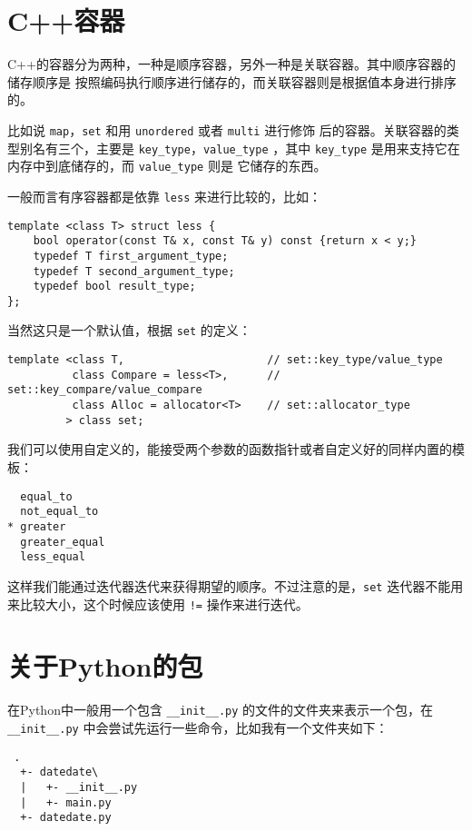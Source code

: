
\section{C++容器}

C++的容器分为两种，一种是顺序容器，另外一种是关联容器。其中顺序容器的储存顺序是
按照编码执行顺序进行储存的，而关联容器则是根据值本身进行排序的。

比如说 \verb|map|，\verb|set| 和用 \verb|unordered| 或者 \verb|multi| 进行修饰
后的容器。关联容器的类型别名有三个，主要是 \verb|key_type|，\verb|value_type|%
，其中 \verb|key_type| 是用来支持它在内存中到底储存的，而 \verb|value_type| 则是
它储存的东西。

一般而言有序容器都是依靠 \verb|less| 来进行比较的，比如：
\begin{lstlisting}
template <class T> struct less {
    bool operator(const T& x, const T& y) const {return x < y;}
    typedef T first_argument_type;
    typedef T second_argument_type;
    typedef bool result_type;
};
\end{lstlisting}

当然这只是一个默认值，根据 \verb|set| 的定义：
\begin{lstlisting}
template <class T,                      // set::key_type/value_type
          class Compare = less<T>,      // set::key_compare/value_compare
          class Alloc = allocator<T>    // set::allocator_type
         > class set;
\end{lstlisting}

我们可以使用自定义的，能接受两个参数的函数指针或者自定义好的同样内置的模板：
\begin{lstlisting}
  equal_to
  not_equal_to
* greater
  greater_equal
  less_equal
\end{lstlisting}

这样我们能通过迭代器迭代来获得期望的顺序。不过注意的是，\verb|set| 迭代器不能用
来比较大小，这个时候应该使用 \verb|!=| 操作来进行迭代。


\section{关于Python的包}

在Python中一般用一个包含 \verb|__init__.py| 的文件的文件夹来表示一个包，在 %
\verb|__init__.py| 中会尝试先运行一些命令，比如我有一个文件夹如下：
\begin{lstlisting}
 .
  +- datedate\
  |   +- __init__.py
  |   +- main.py
  +- datedate.py
\end{lstlisting}

